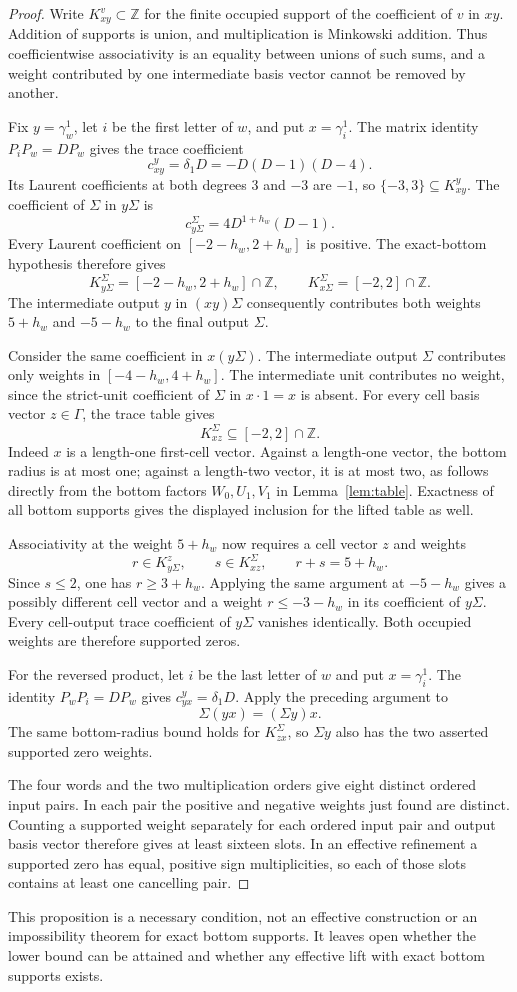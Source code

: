 \begin{proof}
Write $K_{xy}^v\subset\mathbb Z$ for the finite occupied support of the coefficient of $v$ in $xy$. Addition of supports is union, and multiplication is Minkowski addition. Thus coefficientwise associativity is an equality between unions of such sums, and a weight contributed by one intermediate basis vector cannot be removed by another.

Fix $y=\gamma_w^1$, let $i$ be the first letter of $w$, and put $x=\gamma_i^1$. The matrix identity $P_iP_w=DP_w$ gives the trace coefficient
\[
 c_{xy}^y=\delta_1D=-D(D-1)(D-4).
\]
Its Laurent coefficients at both degrees $3$ and $-3$ are $-1$, so $\{-3,3\}\subseteq K_{xy}^y$. The coefficient of $\Sigma$ in $y\Sigma$ is
\[
 c_{y\Sigma}^{\Sigma}=4D^{1+h_w}(D-1).
\]
Every Laurent coefficient on $[-2-h_w,2+h_w]$ is positive. The exact-bottom hypothesis therefore gives
\[
 K_{y\Sigma}^{\Sigma}=[-2-h_w,2+h_w]\cap\mathbb Z,
 \qquad K_{x\Sigma}^{\Sigma}=[-2,2]\cap\mathbb Z.
\]
The intermediate output $y$ in $(xy)\Sigma$ consequently contributes both weights $5+h_w$ and $-5-h_w$ to the final output $\Sigma$.

Consider the same coefficient in $x(y\Sigma)$. The intermediate output $\Sigma$ contributes only weights in $[-4-h_w,4+h_w]$. The intermediate unit contributes no weight, since the strict-unit coefficient of $\Sigma$ in $x\cdot1=x$ is absent. For every cell basis vector $z\in\Gamma$, the trace table gives
\[
 K_{xz}^{\Sigma}\subseteq[-2,2]\cap\mathbb Z.
\]
Indeed $x$ is a length-one first-cell vector. Against a length-one vector, the bottom radius is at most one; against a length-two vector, it is at most two, as follows directly from the bottom factors $W_0,U_1,V_1$ in Lemma~\ref{lem:table}. Exactness of all bottom supports gives the displayed inclusion for the lifted table as well.

Associativity at the weight $5+h_w$ now requires a cell vector $z$ and weights
\[
 r\in K_{y\Sigma}^z,\qquad s\in K_{xz}^{\Sigma},
 \qquad r+s=5+h_w.
\]
Since $s\le2$, one has $r\ge3+h_w$. Applying the same argument at $-5-h_w$ gives a possibly different cell vector and a weight $r\le-3-h_w$ in its coefficient of $y\Sigma$. Every cell-output trace coefficient of $y\Sigma$ vanishes identically. Both occupied weights are therefore supported zeros.

For the reversed product, let $i$ be the last letter of $w$ and put $x=\gamma_i^1$. The identity $P_wP_i=DP_w$ gives $c_{yx}^y=\delta_1D$. Apply the preceding argument to
\[
 \Sigma(yx)=(\Sigma y)x.
\]
The same bottom-radius bound holds for $K_{zx}^{\Sigma}$, so $\Sigma y$ also has the two asserted supported zero weights.

The four words and the two multiplication orders give eight distinct ordered input pairs. In each pair the positive and negative weights just found are distinct. Counting a supported weight separately for each ordered input pair and output basis vector therefore gives at least sixteen slots. In an effective refinement a supported zero has equal, positive sign multiplicities, so each of those slots contains at least one cancelling pair.
\end{proof}

This proposition is a necessary condition, not an effective construction or an impossibility theorem for exact bottom supports. It leaves open whether the lower bound can be attained and whether any effective lift with exact bottom supports exists.
